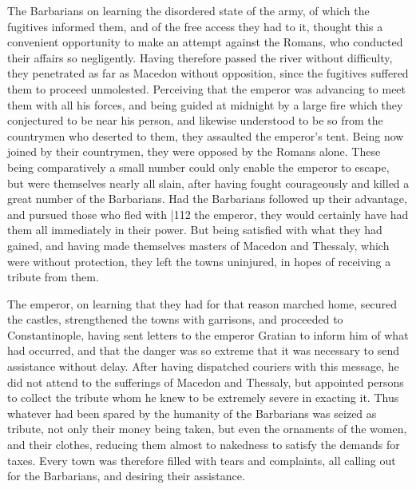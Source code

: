 The Barbarians on learning the disordered state of the army, of which the fugitives informed them, and of the free access they had to it, thought this a convenient opportunity to make an attempt against the Romans, who conducted their affairs so negligently. Having therefore passed the river without difficulty, they penetrated as far as Macedon without opposition, since the fugitives suffered them to proceed unmolested. Perceiving that the emperor was advancing to meet them with all his forces, and being guided at midnight by a large fire which they conjectured to be near his person, and likewise understood to be so from the countrymen who deserted to them, they assaulted the emperor's tent. Being now joined by their countrymen, they were opposed by the Romans alone. These being comparatively a small number could only enable the emperor to escape, but were themselves nearly all slain, after having fought courageously and killed a great number of the Barbarians. Had the Barbarians
followed up their advantage, and pursued those who fled with |112
the emperor, they would certainly have had them all immediately in their power. But being satisfied with what they had gained, and having made themselves masters of Macedon and Thessaly, which were without protection, they left the towns uninjured, in hopes of receiving a tribute from them.

The emperor, on learning that they had for that reason marched home, secured the castles, strengthened the towns with garrisons, and proceeded to Constantinople, having sent letters to the emperor Gratian to inform him of what had occurred, and that the danger was so extreme that it was necessary to send assistance without delay. After having dispatched couriers with this message, he did not attend to the sufferings of Macedon and Thessaly, but appointed persons to collect the tribute whom he knew to be extremely severe in exacting it. Thus whatever had been spared by the humanity of the Barbarians was seized as tribute, not only their money being taken, but even the ornaments of the women, and their clothes, reducing them almost to nakedness to satisfy the demands for taxes. Every town was therefore filled with tears and complaints, all calling out for the Barbarians, and desiring their assistance.

